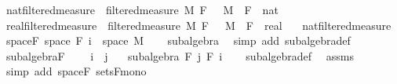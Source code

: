 \begin{isabellebody}
\isanewline
\isanewline
\isanewline
{}\isamarkupfalse%
\ nat{\isacharunderscore}{\kern0pt}filtered{\isacharunderscore}{\kern0pt}measure\ {\isacharequal}{\kern0pt}\ filtered{\isacharunderscore}{\kern0pt}measure\ M\ F\ {}\ \ M\ \ F\ {\isacharcolon}{\kern0pt}{\isacharcolon}{\kern0pt}\ {\isachardoublequoteopen}nat\ {\isasymRightarrow}\ {\isacharunderscore}{\kern0pt}{\isachardoublequoteclose}\isanewline
{}\isamarkupfalse%
\ real{\isacharunderscore}{\kern0pt}filtered{\isacharunderscore}{\kern0pt}measure\ {\isacharequal}{\kern0pt}\ filtered{\isacharunderscore}{\kern0pt}measure\ M\ F\ {}\ \ M\ \ F\ {\isacharcolon}{\kern0pt}{\isacharcolon}{\kern0pt}\ {\isachardoublequoteopen}real\ {\isasymRightarrow}\ {\isacharunderscore}{\kern0pt}{\isachardoublequoteclose}\isanewline
\isanewline
{}\isamarkupfalse%
\ nat{\isacharunderscore}{\kern0pt}filtered{\isacharunderscore}{\kern0pt}measure\isanewline
{}\isanewline
\isanewline
{}\isamarkupfalse%
\ space{\isacharunderscore}{\kern0pt}F{\isacharcolon}{\kern0pt}\ {\isachardoublequoteopen}space\ {\isacharparenleft}{\kern0pt}F\ i{\isacharparenright}{\kern0pt}\ {\isacharequal}{\kern0pt}\ space\ M{\isachardoublequoteclose}\isanewline
%
\isadelimproof
\ \ %
\endisadelimproof
%
\isatagproof
{}\isamarkupfalse%
\ subalgebra\ \isamarkupfalse%
\ {\isacharparenleft}{\kern0pt}simp\ add{\isacharcolon}{\kern0pt}\ subalgebra{\isacharunderscore}{\kern0pt}def{\isacharparenright}{\kern0pt}%
\endisatagproof
{\isafoldproof}%
%
\isadelimproof
\isanewline
%
\endisadelimproof
\isanewline
{}\isamarkupfalse%
\ subalgebra{\isacharunderscore}{\kern0pt}F{\isacharcolon}{\kern0pt}\ \isanewline
\ \ \ {\isachardoublequoteopen}i\ {\isasymle}\ j{\isachardoublequoteclose}\isanewline
\ \ \ {\isachardoublequoteopen}subalgebra\ {\isacharparenleft}{\kern0pt}F\ j{\isacharparenright}{\kern0pt}\ {\isacharparenleft}{\kern0pt}F\ i{\isacharparenright}{\kern0pt}{\isachardoublequoteclose}\isanewline
%
\isadelimproof
\ \ %
\endisadelimproof
%
\isatagproof
{}\isamarkupfalse%
\ subalgebra{\isacharunderscore}{\kern0pt}def\ \isamarkupfalse%
\ assms\ \isamarkupfalse%
\ {\isacharparenleft}{\kern0pt}simp\ add{\isacharcolon}{\kern0pt}\ space{\isacharunderscore}{\kern0pt}F\ sets{\isacharunderscore}{\kern0pt}F{\isacharunderscore}{\kern0pt}mono{\isacharparenright}{\kern0pt}%
\endisatagproof

\end{isabellebody}
